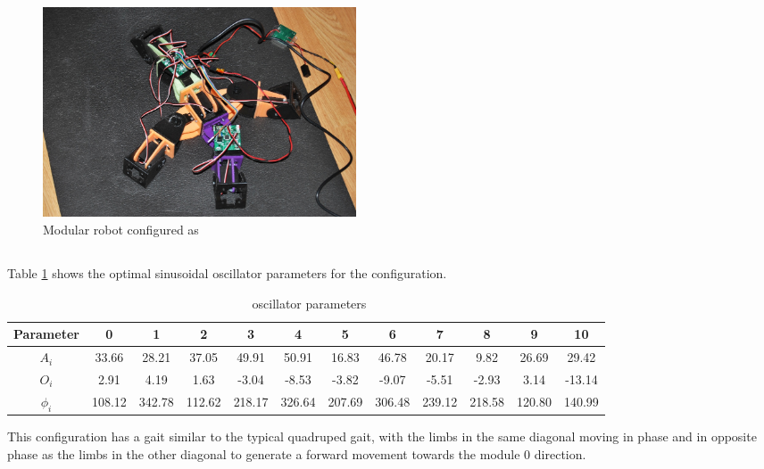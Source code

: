 \begin{figure}[h]
		\centering
        \includegraphics[width=0.45\textwidth]{images/results_9_real_robot.jpg}
        \caption{Modular robot configured as \robotNine}
        \label{fig:robot_9_real}
\end{figure} 

\subsection{\robotEleven}


Table \ref{table:robot_11_parameters} shows the optimal sinusoidal oscillator parameters for the \robotEleven configuration.\\


\begin{table}[H]
\centering
\begin{tabular}{|c||c|c|c|c|c|c|c|c|c|c|c|} \hline
Parameter & 0 & 1 & 2 & 3 & 4 & 5 & 6 & 7 & 8 & 9 & 10 \\ \hline
\hline $A_i$ & 33.66 & 28.21 & 37.05 & 49.91 & 50.91 & 16.83 & 46.78 & 20.17 & 9.82 & 26.69 & 29.42 \\ 
\hline $O_i$ & 2.91 & 4.19 & 1.63 & -3.04 & -8.53 & -3.82 & -9.07 & -5.51 & -2.93 & 3.14 & -13.14  \\ 
\hline $\phi_i$ & 108.12 & 342.78 & 112.62 & 218.17 & 326.64 & 207.69 & 306.48 & 239.12 & 218.58 & 120.80 & 140.99  \\ 
\hline 
\end{tabular}
\caption{\robotEleven ~oscillator parameters}
\label{table:robot_11_parameters}
\end{table}

This configuration has a gait similar to the typical quadruped gait, with the limbs in the same diagonal moving in phase and in opposite phase as the limbs in the other diagonal to generate a forward movement towards the module 0 direction.\\

